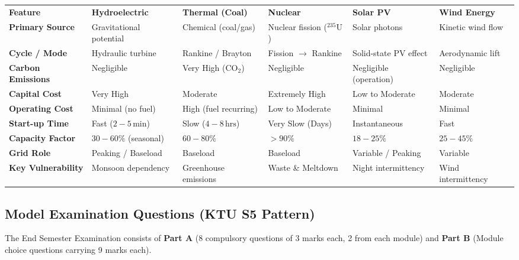 \documentclass[11pt,a4paper]{article}
\newenvironment{Warn}[1][Important Exam Alert]{\begin{tcolorbox}[warnbox, title=#1]}{\end{tcolorbox}}
\begin{document}
\begin{center}
\scriptsize
\begin{tabularx}{\textwidth}{L{1.8cm} L{2.6cm} L{2.4cm} L{2.2cm} L{2.4cm} X}
  \color{white}\textbf{Feature} & \color{white}\textbf{Hydroelectric} & \color{white}\textbf{Thermal (Coal)} & \color{white}\textbf{Nuclear} & \color{white}\textbf{Solar PV} & \color{white}\textbf{Wind Energy} \\
   \textbf{Primary Source} & Gravitational potential & Chemical (coal/gas) & Nuclear fission ($^{235}\text{U}$) & Solar photons & Kinetic wind flow \\
  \textbf{Cycle / Mode} & Hydraulic turbine & Rankine / Brayton & Fission $\to$ Rankine & Solid-state PV effect & Aerodynamic lift \\
   \textbf{Carbon Emissions} & Negligible & Very High ($\text{CO}_2$) & Negligible & Negligible (operation) & Negligible \\
  \textbf{Capital Cost} & Very High & Moderate & Extremely High & Low to Moderate & Moderate \\
   \textbf{Operating Cost} & Minimal (no fuel) & High (fuel recurring) & Low to Moderate & Minimal & Minimal \\
  \textbf{Start-up Time} & Fast ($2-5\,\text{min}$) & Slow ($4-8\,\text{hrs}$) & Very Slow (Days) & Instantaneous & Fast \\
   \textbf{Capacity Factor} & $30-60\%$ (seasonal) & $60-80\%$ & $>90\%$ & $18-25\%$ & $25-45\%$ \\
  \textbf{Grid Role} & Peaking / Baseload & Baseload & Baseload & Variable / Peaking & Variable \\
   \textbf{Key Vulnerability} & Monsoon dependency & Greenhouse emissions & Waste \& Meltdown & Night intermittency & Wind intermittency \\
\end{tabularx}
\end{center}

\subsection{Model Examination Questions (KTU S5 Pattern)}

\begin{Warn}[University Examination Pattern (PCEOT503 Scheme)]
The End Semester Examination consists of \textbf{Part A} (8 compulsory questions of 3 marks each, 2 from each module) and \textbf{Part B} (Module choice questions carrying 9 marks each).
\end{Warn}
\end{document}

